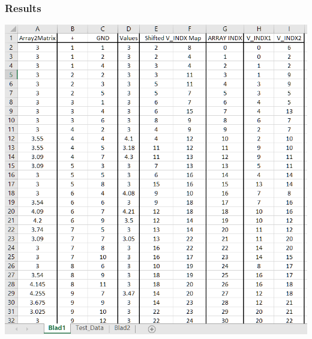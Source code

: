 \documentclass{beamer}
\begin{document}
\begin{frame}
    \frametitle{Results}
    \begin{center}
        \includegraphics[width=.8\textwidth]{img/VoltageToMatrixMap_withTestArray.PNG}
    \end{center}

\end{frame}

\begin{frame}
\end{frame}
\end{document}
